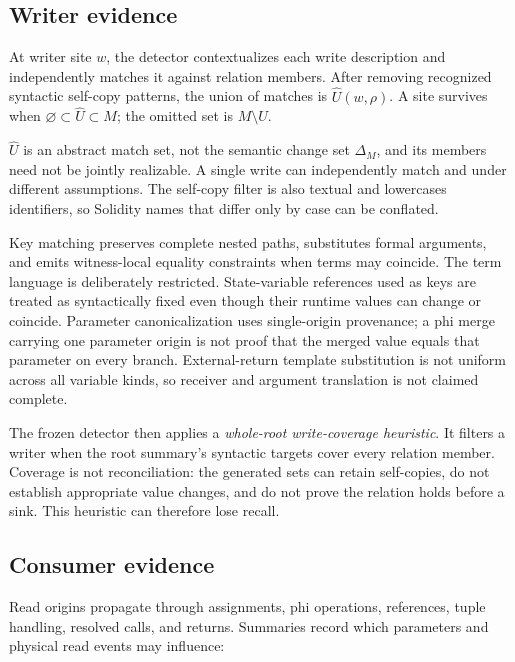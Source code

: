 \subsection{Writer evidence}
\label{s:writer-analysis}

At writer site \(w\), the detector contextualizes each write description and independently matches it against relation members. After removing recognized syntactic self-copy patterns, the union of matches is \(\widehat{U}(w,\rho)\). A site survives when \(\varnothing\subset\widehat{U}\subset M\); the omitted set is \(M\setminus\widehat{U}\).

\(\widehat{U}\) is an abstract match set, not the semantic change set \(\Delta_M\), and its members need not be jointly realizable. A single  write can independently match  and  under different assumptions. The self-copy filter is also textual and lowercases identifiers, so Solidity names that differ only by case can be conflated.

Key matching preserves complete nested paths, substitutes formal arguments, and emits witness-local equality constraints when terms may coincide. The term language is deliberately restricted. State-variable references used as keys are treated as syntactically fixed even though their runtime values can change or coincide. Parameter canonicalization uses single-origin provenance; a phi merge carrying one parameter origin is not proof that the merged value equals that parameter on every branch. External-return template substitution is not uniform across all variable kinds, so receiver and argument translation is not claimed complete.

The frozen detector then applies a \emph{whole-root write-coverage heuristic}. It filters a writer when the root summary's syntactic targets cover every relation member. Coverage is not reconciliation: the generated sets can retain self-copies, do not establish appropriate value changes, and do not prove the relation holds before a sink. This heuristic can therefore lose recall.

\subsection{Consumer evidence}
\label{s:consumer-analysis}

Read origins propagate through assignments, phi operations, references, tuple handling, resolved calls, and returns. Summaries record which parameters and physical read events may influence:

